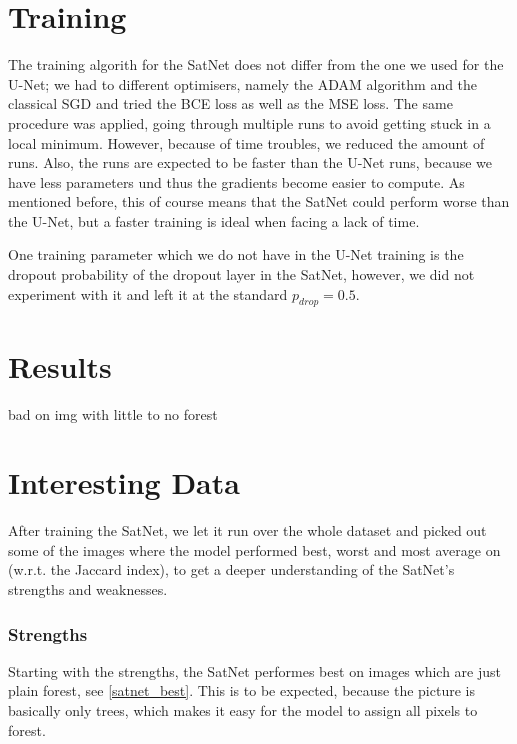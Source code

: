 \section{Training}
The training algorith for the SatNet does not differ from the one we used for the U-Net; we had to different optimisers, namely the ADAM algorithm and the classical SGD and tried the BCE loss as well as the MSE loss. The same procedure was applied, going through multiple runs to avoid getting stuck in a local minimum. However, because of time troubles, we reduced the amount of runs. Also, the runs are expected to be faster than the U-Net runs, because we have less parameters und thus the gradients become easier to compute. As mentioned before, this of course means that the SatNet could perform worse than the U-Net, but a faster training is ideal when facing a lack of time.

One training parameter which we do not have in the U-Net training is the dropout probability of the dropout layer in the SatNet, however, we did not experiment with it and left it at the standard $p_{drop}=0.5$. \\

\section{Results}
bad on img with little to no forest\\

\section{Interesting Data}

After training the SatNet, we let it run over the whole dataset and picked out some of the images where the model performed best, worst and most average on (w.r.t. the Jaccard index), to get a deeper understanding of the SatNet's strengths and weaknesses.

\subsubsection{Strengths}

Starting with the strengths, the SatNet performes best on images which are just plain forest, see \ref{satnet_best}. This is to be expected, because the picture is basically only trees, which makes it easy for the model to assign all pixels to forest.

